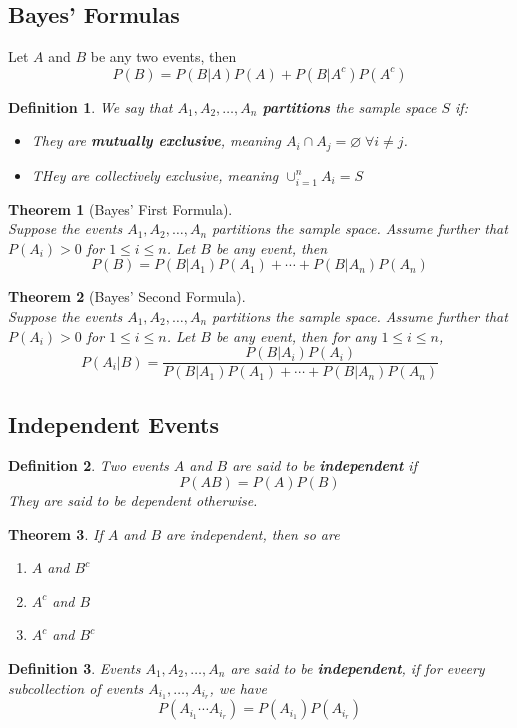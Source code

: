 \documentclass[12pt]{article}
\newtheorem{definition}{Definition}[section]
\newtheorem{theorem}{Theorem}[section]
\theoremstyle{definition}
\begin{document}
\subsection{Bayes' Formulas}
Let $A$ and $B$ be any two events, then
\[
P(B)=P(B|A)P(A)+P(B|A^c)P(A^c)
\]
\begin{definition}\normalfont We say that $A_1,A_2,\ldots,A_n$ \textbf{partitions} the sample space $S$ if:
\begin{itemize}
\item They are \textbf{mutually exclusive}, meaning $A_i\cap A_j = \varnothing\;\forall i\neq j$.
\item THey are collectively exclusive, meaning $\cup_{i=1}^{n}A_i=S$
\end{itemize}
\end{definition}
\begin{theorem}[Bayes' First Formula]
\hfill\\\normalfont Suppose the events $A_1,A_2,\ldots,A_n$ partitions the sample space. Assume further that $P(A_i)>0$ for $1\leq i\leq n$. Let $B$ be any event, then
\[
P(B)=P(B|A_1)P(A_1)+\cdots+P(B|A_n)P(A_n)
\]
\end{theorem}
\begin{theorem}[Bayes' Second Formula]
\hfill\\\normalfont Suppose the events $A_1,A_2,\ldots,A_n$ partitions the sample space. Assume further that $P(A_i)>0$ for $1\leq i\leq n$. Let $B$ be any event, then for any $1\leq i \leq n$,
\[
P(A_i|B)=\frac{P(B|A_i)P(A_i)}{P(B|A_1)P(A_1)+\cdots+P(B|A_n)P(A_n)}
\]
\end{theorem}
\subsection{Independent Events}
\begin{definition}\normalfont Two events $A$ and $B$ are said to be \textbf{independent} if
\[
P(AB)=P(A)P(B)
\]
They are said to be dependent otherwise.
\end{definition}
\begin{theorem}\normalfont If $A$ and $B$ are independent, then so are
\begin{enumerate}
\item $A$ and $B^c$
\item $A^c$ and $B$
\item $A^c$ and $B^c$
\end{enumerate}
\end{theorem}
\begin{definition}\normalfont Events $A_1,A_2,\ldots, A_n$ are said to be \textbf{independent}, if for eveery subcollection of events $A_{i_1},\ldots,A_{i_r}$, we have
\[
P(A_{i_1}\cdots A_{i_r}) =P(A_{i_1})P(A_{i_r}) 
\] 
\end{definition}
\end{document}
